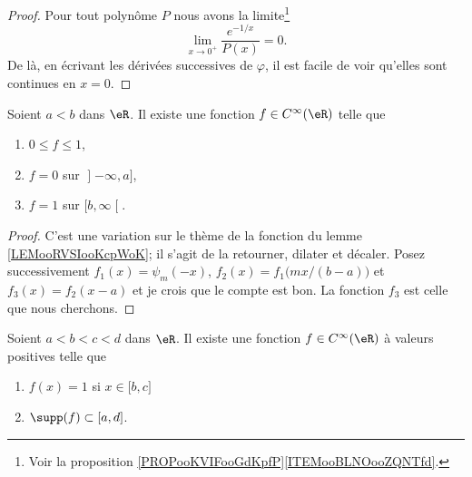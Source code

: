 \begin{proof}
	Pour tout polynôme \( P\) nous avons la limite\footnote{Voir la proposition \ref{PROPooKVIFooGdKpfP}\ref{ITEMooBLNOooZQNTfd}.}
	\begin{equation}
		\lim_{x\to 0^+} \frac{ e^{-1/x} }{ P(x)} =0 .
	\end{equation}
	De là, en écrivant les dérivées successives de \( \varphi\), il est facile de voir qu'elles sont continues en \( x=0\).
\end{proof}



\begin{lemma}     \label{LEMooFFPVooDKGUAp}
	Soient \( a<b\) dans \( \eR\). Il existe une fonction \( f\in  C^{\infty}(\eR)\) telle que
	\begin{enumerate}
		\item
		      \( 0\leq f\leq 1\),
		\item
		      \( f=0\) sur \( \mathopen] -\infty , a \mathclose]\),
		\item
		      \( f=1\) sur \( \mathopen[ b , \infty \mathclose[\).
	\end{enumerate}
\end{lemma}

\begin{proof}
	C'est une variation sur le thème de la fonction du lemme \ref{LEMooRVSIooKcpWoK}; il s'agit de la retourner, dilater et décaler. Posez successivement \( f_1(x)=\psi_m(-x)\), \( f_2(x)=f_1\big(mx/(b-a)\big)\) et \( f_3(x)=f_2(x-a)\) et je crois que le compte est bon. La fonction \( f_3\) est celle que nous cherchons.
\end{proof}

\begin{proposition}     \label{PROPooAZJZooTYWjzb}
	Soient \( a<b<c<d\) dans \( \eR\). Il existe une fonction \( f\in C^{\infty}(\eR)\) à valeurs positives telle que
	\begin{enumerate}
		\item
		      \( f(x)=1\) si \( x\in\mathopen[ b , c \mathclose]\)
		\item
		      \( \supp(f)\subset\mathopen[ a , d \mathclose]\).
	\end{enumerate}
\end{proposition}


